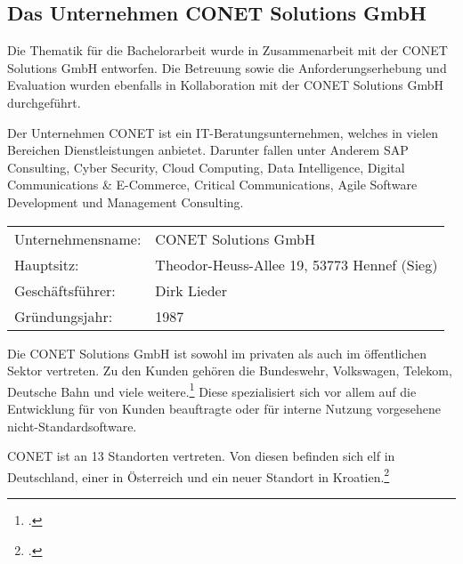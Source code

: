\subsection{Das Unternehmen CONET Solutions GmbH}

Die Thematik für die Bachelorarbeit wurde in Zusammenarbeit mit der CONET Solutions GmbH entworfen. Die Betreuung sowie die Anforderungserhebung und Evaluation wurden ebenfalls in Kollaboration mit der CONET Solutions GmbH durchgeführt.

Der Unternehmen CONET ist ein IT-Beratungsunternehmen, welches in vielen Bereichen Dienstleistungen anbietet. Darunter fallen unter Anderem SAP Consulting, Cyber Security, Cloud Computing, Data Intelligence, Digital Communications \& E-Commerce, Critical Communications, Agile Software Development und Management Consulting. 

\begin{table}[H]
\begin{tabular}{ l l }
Unternehmensname: & CONET Solutions GmbH \\
Hauptsitz: & Theodor-Heuss-Allee 19, 53773 Hennef (Sieg) \\
Geschäftsführer: & Dirk Lieder \\
Gründungsjahr: & 1987 
\end{tabular}
\end{table}

Die CONET Solutions GmbH ist sowohl im privaten als auch im öffentlichen Sektor vertreten. Zu den Kunden gehören die Bundeswehr, Volkswagen, Telekom, Deutsche Bahn und viele weitere.\footcite [Auszug aus der Kundenliste]{Kunden} Diese spezialisiert sich vor allem auf die Entwicklung für von Kunden beauftragte oder für interne Nutzung vorgesehene nicht-Standardsoftware.

CONET ist an 13 Standorten vertreten. Von diesen befinden sich elf in Deutschland, einer in Österreich und ein neuer Standort in Kroatien.\footcite [Internes Dokument]{QuickGuide} 




%


